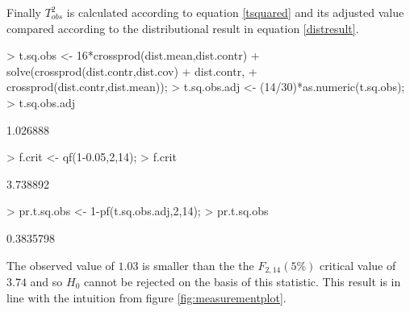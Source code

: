 \documentclass[a4paper,11pt]{article}
\begin{document}
Finally $T^2_{obs}$ is calculated according to equation \ref{tsquared} and its adjusted value compared according to the distributional result in equation \ref{distresult}.
 
\begin{Schunk}
\begin{Sinput}
> t.sq.obs <- 16*crossprod(dist.mean,dist.contr)%*%
+                solve(crossprod(dist.contr,dist.cov)%*%
+                      dist.contr,
+                      crossprod(dist.contr,dist.mean));
> t.sq.obs.adj <- (14/30)*as.numeric(t.sq.obs);
> t.sq.obs.adj
\end{Sinput}
\begin{Soutput}
[1] 1.026888
\end{Soutput}
\begin{Sinput}
> f.crit <- qf(1-0.05,2,14);
> f.crit
\end{Sinput}
\begin{Soutput}
[1] 3.738892
\end{Soutput}
\begin{Sinput}
> pr.t.sq.obs <- 1-pf(t.sq.obs.adj,2,14);
> pr.t.sq.obs
\end{Sinput}
\begin{Soutput}
[1] 0.3835798
\end{Soutput}
\end{Schunk}

The observed value of $
1.03
$ is smaller than the the $F_{2,14}(5\%)$ critical value of $
3.74
$ and so $H_0$ cannot be rejected on the basis of this statistic. This result is in line with the intuition from figure \ref{fig:measurementplot}.\\
\end{document}
